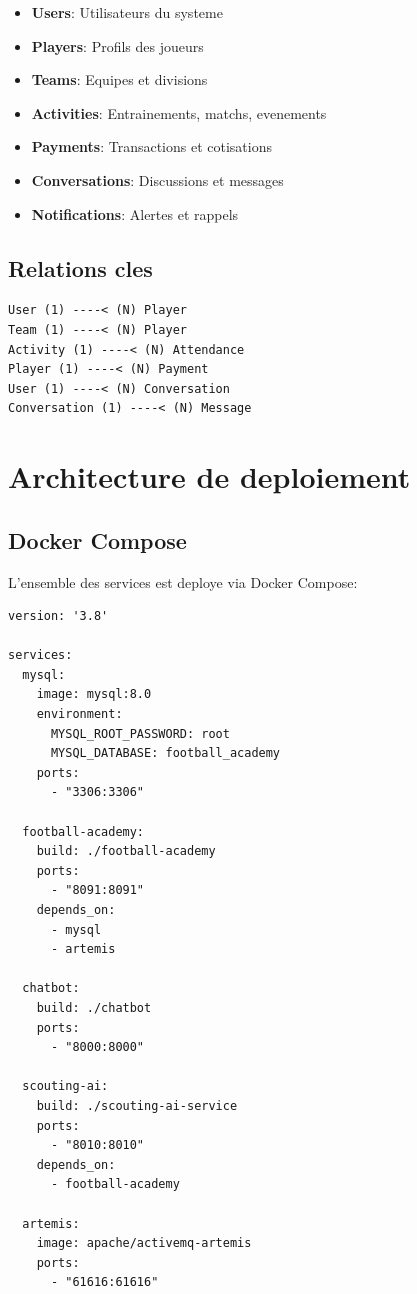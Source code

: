 \begin{itemize}[leftmargin=*]
  \item \textbf{Users}: Utilisateurs du systeme
  \item \textbf{Players}: Profils des joueurs
  \item \textbf{Teams}: Equipes et divisions
  \item \textbf{Activities}: Entrainements, matchs, evenements
  \item \textbf{Payments}: Transactions et cotisations
  \item \textbf{Conversations}: Discussions et messages
  \item \textbf{Notifications}: Alertes et rappels
\end{itemize}

\subsection*{Relations cles}

\begin{lstlisting}[style=codeblock]
User (1) ----< (N) Player
Team (1) ----< (N) Player
Activity (1) ----< (N) Attendance
Player (1) ----< (N) Payment
User (1) ----< (N) Conversation
Conversation (1) ----< (N) Message
\end{lstlisting}

\section{Architecture de deploiement}

\subsection*{Docker Compose}

L'ensemble des services est deploye via Docker Compose:

\begin{lstlisting}[style=codeblock]
version: '3.8'

services:
  mysql:
    image: mysql:8.0
    environment:
      MYSQL_ROOT_PASSWORD: root
      MYSQL_DATABASE: football_academy
    ports:
      - "3306:3306"

  football-academy:
    build: ./football-academy
    ports:
      - "8091:8091"
    depends_on:
      - mysql
      - artemis

  chatbot:
    build: ./chatbot
    ports:
      - "8000:8000"

  scouting-ai:
    build: ./scouting-ai-service
    ports:
      - "8010:8010"
    depends_on:
      - football-academy

  artemis:
    image: apache/activemq-artemis
    ports:
      - "61616:61616"
\end{lstlisting}

